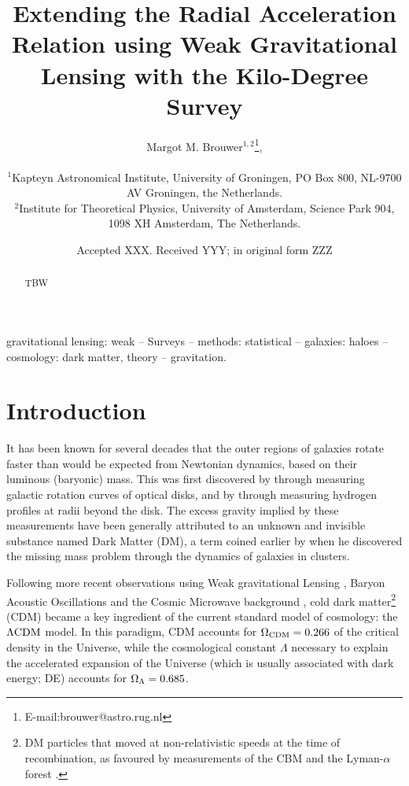 \documentclass[fleqn,usenatbib]{mnras}
\title[Extending the RAR with KiDS weak lensing]{Extending the Radial Acceleration Relation using Weak Gravitational Lensing with the Kilo-Degree Survey}
\author[M. M. Brouwer et al.]{Margot M. Brouwer$^{1,2}$\thanks{E-mail:brouwer@astro.rug.nl},
	\\
	\\
	$^{1}$Kapteyn Astronomical Institute, University of Groningen, PO Box 800, NL-9700 AV Groningen, the Netherlands.\\
	$^{2}$Institute for Theoretical Physics, University of Amsterdam, Science Park 904, 1098 XH Amsterdam, The Netherlands. \\
}
\date{Accepted XXX. Received YYY; in original form ZZZ}
\newcommand{\lcdm}{{\rm \Lambda CDM}}
\begin{document}
\label{firstpage}
\pagerange{\pageref{firstpage}--\pageref{lastpage}}
\maketitle

\begin{abstract}
TBW
\end{abstract}


\begin{keywords}
gravitational lensing: weak -- Surveys -- methods: statistical -- galaxies: haloes -- cosmology: dark matter, theory -- gravitation.
\\
\end{keywords}

\clearpage




\section{Introduction}
\label{sec:introduction}

It has been known for several decades that the outer regions of galaxies rotate faster than would be expected from Newtonian dynamics, based on their luminous (baryonic) mass. This was first discovered by \cite{rubin1983} through measuring galactic rotation curves of optical disks, and by \cite{bosma1981} through measuring hydrogen profiles at radii beyond the disk. The excess gravity implied by these measurements have been generally attributed to an unknown and invisible substance named Dark Matter (DM), a term coined earlier by \cite{zwicky1937} when he discovered the missing mass problem through the dynamics of galaxies in clusters.

Following more recent observations using Weak gravitational Lensing \cite[WL,][]{hoekstra2004,linden2014,mandelbaum2015}, Baryon Acoustic Oscillations \cite[BAO's,][]{eisenstein2005,blake2011} and the Cosmic Microwave background \cite[CMB,][]{spergel2003,planck2015}, cold dark matter\footnote{DM particles that moved at non-relativistic speeds at the time of recombination, as favoured by measurements of the CBM \cite[]{planck2014} and the Lyman-$\alpha$ forest \cite[]{viel2013}.} (CDM) became a key ingredient of the current standard model of cosmology: the $\lcdm$ model. In this paradigm, CDM accounts for $\Omega_{\rm CDM}=0.266$ of the critical density in the Universe, while the cosmological constant $\Lambda$ necessary to explain the accelerated expansion of the Universe (which is usually associated with dark energy; DE) accounts for $\Omega_{\rm \Lambda}=0.685$.
\end{document}
